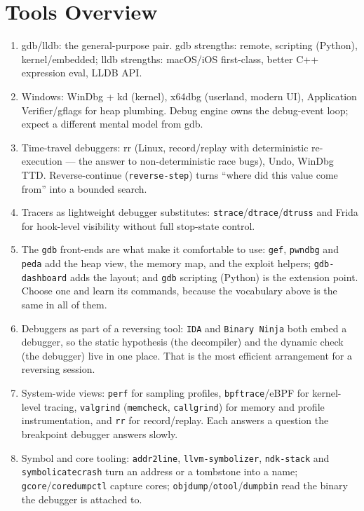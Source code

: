 \documentclass[12pt]{Training}
\begin{document}
\section*{Tools Overview}
\begin{enumerate}
    \item gdb/lldb: the general-purpose pair. gdb strengths: remote, scripting (Python), kernel/embedded; lldb strengths: macOS/iOS first-class, better C++ expression eval, LLDB API.
    \item Windows: WinDbg + kd (kernel), x64dbg (userland, modern UI), Application Verifier/gflags for heap plumbing. Debug engine owns the debug-event loop; expect a different mental model from gdb.
    \item Time-travel debuggers: rr (Linux, record/replay with deterministic re-execution --- the answer to non-deterministic race bugs), Undo, WinDbg TTD. Reverse-continue (\lstinline{reverse-step}) turns ``where did this value come from'' into a bounded search.
    \item Tracers as lightweight debugger substitutes: \lstinline{strace}/\lstinline{dtrace}/\lstinline{dtruss} and Frida for hook-level visibility without full stop-state control.
    \item The \lstinline{gdb} front-ends are what make it comfortable to use: \lstinline{gef}, \lstinline{pwndbg} and \lstinline{peda} add the heap view, the memory map, and the exploit helpers; \lstinline{gdb-dashboard} adds the layout; and \lstinline{gdb} scripting (Python) is the extension point. Choose one and learn its commands, because the vocabulary above is the same in all of them.
    \item Debuggers as part of a reversing tool: \lstinline{IDA} and \lstinline{Binary Ninja} both embed a debugger, so the static hypothesis (the decompiler) and the dynamic check (the debugger) live in one place. That is the most efficient arrangement for a reversing session.
    \item System-wide views: \lstinline{perf} for sampling profiles, \lstinline{bpftrace}/eBPF for kernel-level tracing, \lstinline{valgrind} (\lstinline{memcheck}, \lstinline{callgrind}) for memory and profile instrumentation, and \lstinline{rr} for record/replay. Each answers a question the breakpoint debugger answers slowly.
    \item Symbol and core tooling: \lstinline{addr2line}, \lstinline{llvm-symbolizer}, \lstinline{ndk-stack} and \lstinline{symbolicatecrash} turn an address or a tombstone into a name; \lstinline{gcore}/\lstinline{coredumpctl} capture cores; \lstinline{objdump}/\lstinline{otool}/\lstinline{dumpbin} read the binary the debugger is attached to.
\end{enumerate}
\end{document}
